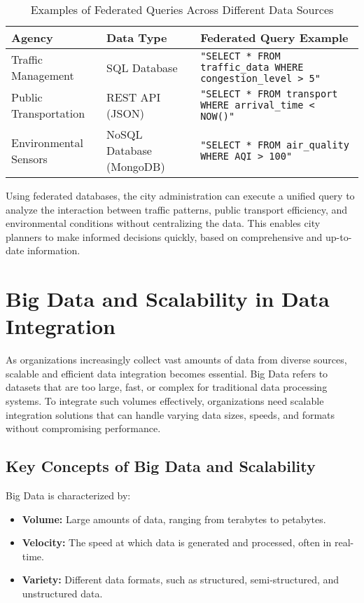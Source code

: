 \documentclass[12pt]{article}
\begin{document}
\begin{table}[H]
    \centering
    \begin{tabular}{|p{4cm}|p{4cm}|p{6cm}|}
        \hline
        \textbf{Agency} & \textbf{Data Type} & \textbf{Federated Query Example} \\ \hline
        Traffic Management & SQL Database & \texttt{"SELECT * FROM traffic\_data WHERE congestion\_level > 5"} \\ \hline
        Public Transportation & REST API (JSON) & \texttt{"SELECT * FROM transport WHERE arrival\_time < NOW()"} \\ \hline
        Environmental Sensors & NoSQL Database (MongoDB) & \texttt{"SELECT * FROM air\_quality WHERE AQI > 100"} \\ \hline
    \end{tabular}
    \caption{Examples of Federated Queries Across Different Data Sources}
\end{table}

Using federated databases, the city administration can execute a unified query to analyze the interaction between traffic patterns, public transport efficiency, and environmental conditions without centralizing the data. This enables city planners to make informed decisions quickly, based on comprehensive and up-to-date information.

\section{Big Data and Scalability in Data Integration}
As organizations increasingly collect vast amounts of data from diverse sources, scalable and efficient data integration becomes essential. Big Data refers to datasets that are too large, fast, or complex for traditional data processing systems. To integrate such volumes effectively, organizations need scalable integration solutions that can handle varying data sizes, speeds, and formats without compromising performance.

\subsection{Key Concepts of Big Data and Scalability}
Big Data is characterized by:
\begin{itemize}
    \item \textbf{Volume:} Large amounts of data, ranging from terabytes to petabytes.
    \item \textbf{Velocity:} The speed at which data is generated and processed, often in real-time.
    \item \textbf{Variety:} Different data formats, such as structured, semi-structured, and unstructured data.
\end{itemize}
\end{document}
